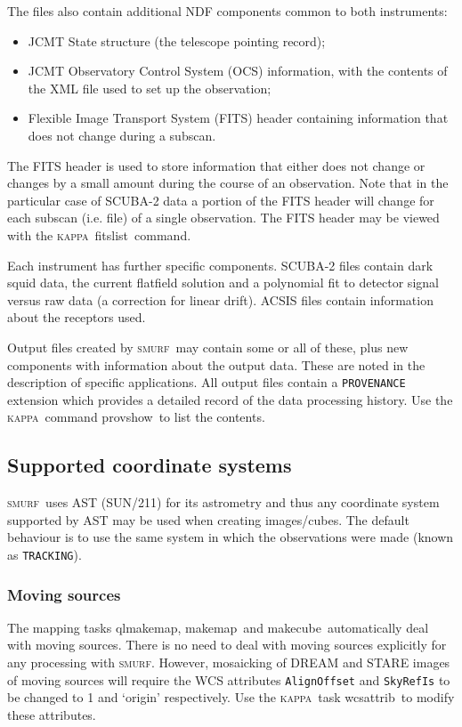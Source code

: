 \documentclass[twoside,11pt]{article}
\newcommand{\xref}[3]{#1}
\renewcommand{\_}{\texttt{\symbol{95}}}
\newcommand{\KAPPA}{\textsc{kappa}}
\newcommand{\SMURF}{\textsc{smurf}}
\newcommand{\astref}{\xref{SUN/211}{sun211}{}}
\newcommand{\task}[1]{\textsf{#1}}
\newcommand{\makecube}{\xref{\task{makecube}}{sun258}{MAKECUBE}}
\newcommand{\qlmakemap}{\xref{\task{qlmakemap}}{sun258}{QLMAKEMAP}}
\newcommand{\makemap}{\xref{\task{makemap}}{sun258}{MAKEMAP}}
\newcommand{\provshow}{\xref{\task{provshow}}{sun95}{PROVSHOW}}
\newcommand{\wcsattrib}{\xref{\task{wcsattrib}}{sun95}{WCSATTRIB}}
\newcommand{\fitslist}{\xref{\task{fitslist}}{sun95}{FITSLIST}}
\newcommand{\aparam}[1]{\texttt{#1}}     %
\newcommand{\ndfcomp}[1]{\texttt{#1}}    %
\begin{document}
The files also contain additional NDF components common to both
instruments:
\begin{itemize}
\item JCMT State structure (the telescope pointing record);
\item JCMT Observatory Control System (OCS) information, with the
  contents of the XML file used to set up the observation;
\item Flexible Image Transport System (FITS) header containing
  information that does not change during a subscan.
\end{itemize}
The FITS header is used to store information that either does not
change or changes by a small amount during the course of an
observation. Note that in the particular case of SCUBA-2 data a
portion of the FITS header will change for each subscan (i.e. file) of
a single observation. The FITS header may be viewed with the \KAPPA\
\fitslist\ command.

Each instrument has further specific components. SCUBA-2 files contain
dark squid data, the current flatfield solution and a polynomial fit
to detector signal versus raw data (a correction for linear drift).
ACSIS files contain information about the receptors used.

Output files created by \SMURF\ may contain some or all of these, plus
new components with information about the output data. These are noted
in the description of specific applications. All output files contain
a \ndfcomp{PROVENANCE} extension which provides a detailed record of
the data processing history. Use the \KAPPA\ command \provshow\ to list
the contents.

\subsection{Supported coordinate systems}

\SMURF\ uses AST (\astref) for its astrometry and thus any coordinate
system supported by AST may be used when creating images/cubes. The
default behaviour is to use the same system in which the observations
were made (known as \aparam{TRACKING}).

\subsubsection{Moving sources}

The mapping tasks \qlmakemap, \makemap\ and \makecube\ automatically
deal with moving sources. There is no need to deal with moving sources
explicitly for any processing with \SMURF. However, mosaicking of
DREAM and STARE images of moving sources will require the WCS
attributes \verb+AlignOffset+ and \verb+SkyRefIs+ to be changed to 1
and `origin' respectively. Use the \KAPPA\ task \wcsattrib\ to
modify these attributes.
\end{document}
